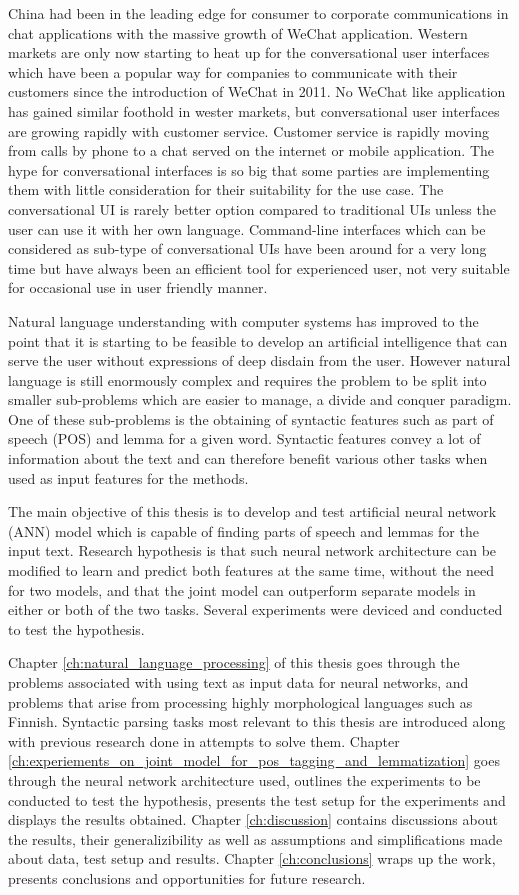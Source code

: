 \documentclass[12pt,a4paper,english
]{tutthesis}
\begin{document}
China had been in the leading edge for consumer to corporate communications in chat applications with the massive growth of WeChat application. Western markets are only now starting to heat up for the conversational user interfaces which have been a popular way for companies to communicate with their customers since the introduction of WeChat in 2011. No WeChat like application has gained similar foothold in wester markets, but conversational user interfaces are growing rapidly with customer service. Customer service is rapidly moving from calls by phone to a chat served on the internet or mobile application. The hype for conversational interfaces is so big that some parties are implementing them with little consideration for their suitability for the use case. The conversational UI is rarely better option compared to traditional UIs unless the user can use it with her own language. Command-line interfaces which can be considered as sub-type of conversational UIs have been around for a very long time but have always been an efficient tool for experienced user, not very suitable for occasional use in user friendly manner.

Natural language understanding with computer systems has improved to the point that it is starting to be feasible to develop an artificial intelligence that can serve the user without expressions of deep disdain from the user. However natural language is still enormously complex and requires the problem to be split into smaller sub-problems which are easier to manage, a divide and conquer paradigm. One of these sub-problems is the obtaining of syntactic features such as part of speech (POS) and lemma for a given word. Syntactic features convey a lot of information about the text and can therefore benefit various other tasks when used as input features for the methods.

The main objective of this thesis is to develop and test artificial neural network (ANN) model which is capable of finding parts of speech and lemmas for the input text. Research hypothesis is that such neural network architecture can be modified to learn and predict both features at the same time, without the need for two models, and that the joint model can outperform separate models in either or both of the two tasks. Several experiments were deviced and conducted to test the hypothesis.

Chapter \ref{ch:natural_language_processing} of this thesis goes through the problems associated with using text as input data for neural networks, and problems that arise from processing highly morphological languages such as Finnish. Syntactic parsing tasks most relevant to this thesis are introduced along with previous research done in attempts to solve them. Chapter \ref{ch:experiements_on_joint_model_for_pos_tagging_and_lemmatization} goes through the neural network architecture used, outlines the experiments to be conducted to test the hypothesis, presents the test setup for the experiments and displays the results obtained. Chapter \ref{ch:discussion} contains discussions about the results, their generalizibility as well as assumptions and simplifications made about data, test setup and results. Chapter \ref{ch:conclusions} wraps up the work, presents conclusions and opportunities for future research.
\end{document}
